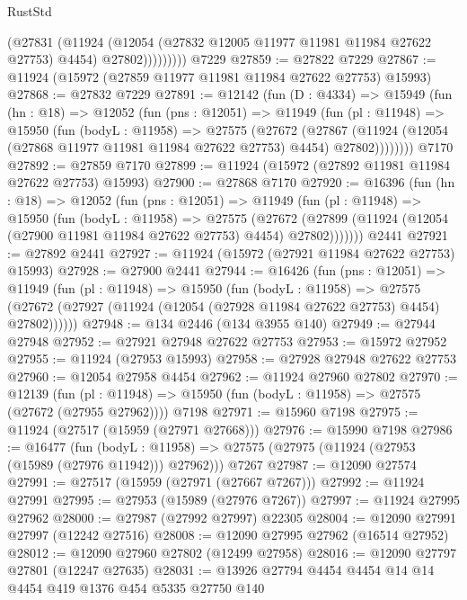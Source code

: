 \begin{lexlean}{RustStd}
\begin{coremodule}
{\begin{coremodule}
{{{{{{{{{{{{{{{{{{{{{{{{{{{{{{{{{{{{{{{{{{{{{{{{{{{{{{{{{{{{{{{{{{{{{{{{{{{{{{{{                  (@27831
                    (@11924
                      (@12054 (@27832 @12005 @11977 @11981 @11984 @27622 @27753) @4454)
                      @27802)))))))))
    @7229
@27859 := @27822 @7229
@27867 := @11924 (@15972 (@27859 @11977 @11981 @11984 @27622 @27753) @15993)
@27868 := @27832 @7229
@27891 := @12142
    (fun (D : @4334) =>
    @15949
      (fun (hn : @18) =>
      @12052
        (fun (pns : @12051) =>
        @11949
          (fun (pl : @11948) =>
          @15950
            (fun (bodyL : @11958) =>
            @27575
              (@27672
                (@27867
                  (@11924 (@12054 (@27868 @11977 @11981 @11984 @27622 @27753) @4454) @27802))))))))
    @7170
@27892 := @27859 @7170
@27899 := @11924 (@15972 (@27892 @11981 @11984 @27622 @27753) @15993)
@27900 := @27868 @7170
@27920 := @16396
    (fun (hn : @18) =>
    @12052
      (fun (pns : @12051) =>
      @11949
        (fun (pl : @11948) =>
        @15950
          (fun (bodyL : @11958) =>
          @27575
            (@27672
              (@27899 (@11924 (@12054 (@27900 @11981 @11984 @27622 @27753) @4454) @27802)))))))
    @2441
@27921 := @27892 @2441
@27927 := @11924 (@15972 (@27921 @11984 @27622 @27753) @15993)
@27928 := @27900 @2441
@27944 := @16426
    (fun (pns : @12051) =>
    @11949
      (fun (pl : @11948) =>
      @15950
        (fun (bodyL : @11958) =>
        @27575 (@27672 (@27927 (@11924 (@12054 (@27928 @11984 @27622 @27753) @4454) @27802))))))
@27948 := @134 @2446 (@134 @3955 @140)
@27949 := @27944 @27948
@27952 := @27921 @27948 @27622 @27753
@27953 := @15972 @27952
@27955 := @11924 (@27953 @15993)
@27958 := @27928 @27948 @27622 @27753
@27960 := @12054 @27958 @4454
@27962 := @11924 @27960 @27802
@27970 := @12139
    (fun (pl : @11948) => @15950 (fun (bodyL : @11958) => @27575 (@27672 (@27955 @27962))))
    @7198
@27971 := @15960 @7198
@27975 := @11924 (@27517 (@15959 (@27971 @27668)))
@27976 := @15990 @7198
@27986 := @16477
    (fun (bodyL : @11958) => @27575 (@27975 (@11924 (@27953 (@15989 (@27976 @11942))) @27962)))
    @7267
@27987 := @12090 @27574
@27991 := @27517 (@15959 (@27971 (@27667 @7267)))
@27992 := @11924 @27991
@27995 := @27953 (@15989 (@27976 @7267))
@27997 := @11924 @27995 @27962
@28000 := @27987 (@27992 @27997) @22305
@28004 := @12090 @27991 @27997 (@12242 @27516)
@28008 := @12090 @27995 @27962 (@16514 @27952)
@28012 := @12090 @27960 @27802 (@12499 @27958)
@28016 := @12090 @27797 @27801 (@12247 @27635)
@28031 := @13926
    @27794
    @4454
    @4454
    @14
    @14
    @4454
    @419
    @1376
    @454
    @5335
    @27750
    @140
}}}}}}}}}}}}}}}}}}}}}}}}}}}}}}}}}}}}}}}}}}}}}}}}}}}}}}}}}}}}}}}}}}}}}}}}}}}}}}}}
\end{coremodule}}
\end{coremodule}
\end{lexlean}

